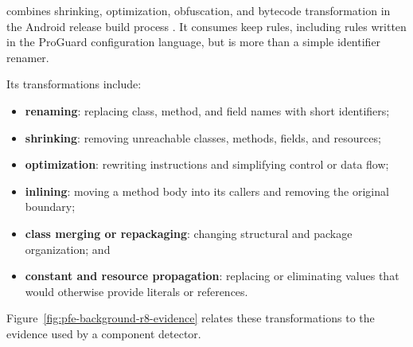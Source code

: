 \Reight combines shrinking, optimization, obfuscation, and bytecode
transformation in the Android release build process
\cite{androidShrinkCode}. It consumes keep rules, including rules written in
the ProGuard configuration language, but \Reight is more than a simple
identifier renamer.

Its transformations include:

\begin{itemize}
  \item \textbf{renaming}: replacing class, method, and field names with short
  identifiers;
  \item \textbf{shrinking}: removing unreachable classes, methods, fields, and
  resources;
  \item \textbf{optimization}: rewriting instructions and simplifying control
  or data flow;
  \item \textbf{inlining}: moving a method body into its callers and removing
  the original boundary;
  \item \textbf{class merging or repackaging}: changing structural and package
  organization; and
  \item \textbf{constant and resource propagation}: replacing or eliminating
  values that would otherwise provide literals or references.
\end{itemize}

Figure~\ref{fig:pfe-background-r8-evidence} relates these transformations to
the evidence used by a component detector.

